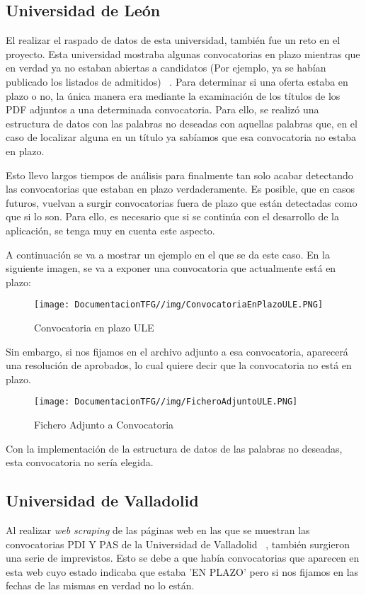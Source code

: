 \subsection{Universidad de León}
El realizar el raspado de datos de esta universidad, también fue un reto en el proyecto. Esta universidad mostraba algunas convocatorias en plazo mientras que en verdad ya no estaban abiertas a candidatos (Por ejemplo, ya se habían publicado los listados de admitidos) ~\cite{ule:latex}. Para determinar si una oferta estaba en plazo o no, la única manera era mediante la examinación de los títulos de los PDF adjuntos a una determinada convocatoria. Para ello, se realizó una estructura de datos con las palabras no deseadas con aquellas palabras que, en el caso de localizar alguna en un título ya sabíamos que esa convocatoria no estaba en plazo. 

Esto llevo largos tiempos de análisis para finalmente tan solo acabar detectando las convocatorias que estaban en plazo verdaderamente. Es posible, que en casos futuros, vuelvan a surgir convocatorias fuera de plazo que están detectadas como que si lo son. Para ello, es necesario que si se continúa con el desarrollo de la aplicación, se tenga muy en cuenta este aspecto.

A continuación se va a mostrar un ejemplo en el que se da este caso. En la siguiente imagen, se va a exponer una convocatoria que actualmente está en plazo:

\begin{figure}[H]
    \centering
    \texttt{[image: DocumentacionTFG//img/ConvocatoriaEnPlazoULE.PNG]}
    \caption{Convocatoria en plazo ULE}
    \label{fig:enter-label}
\end{figure}

Sin embargo, si nos fijamos en el archivo adjunto a esa convocatoria, aparecerá una resolución de aprobados, lo cual quiere decir que la convocatoria no está en plazo.

\begin{figure}[H]
    \centering
    \texttt{[image: DocumentacionTFG//img/FicheroAdjuntoULE.PNG]}
    \caption{Fichero Adjunto a Convocatoria}
    \label{fig:enter-label}
\end{figure}

Con la implementación de la estructura de datos de las palabras no deseadas, esta convocatoria no sería elegida.

\subsection{Universidad de Valladolid}
Al realizar \textit{web scraping} de las páginas web en las que se muestran las convocatorias PDI Y PAS de la Universidad de Valladolid ~\cite{uva:latex}, también surgieron una serie de imprevistos. Esto se debe a que había convocatorias que aparecen en esta web cuyo estado indicaba que estaba 'EN PLAZO' pero si nos fijamos en las fechas de las mismas en verdad no lo están.

